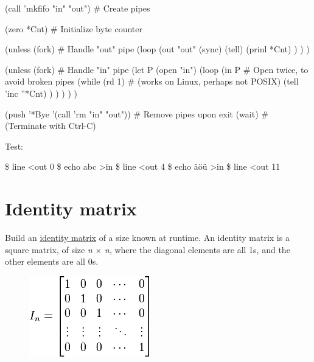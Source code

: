 \begin{wideverbatim}

(call 'mkfifo "in" "out")              # Create pipes

(zero *Cnt)                            # Initialize byte counter

(unless (fork)                         # Handle "out" pipe
   (loop
      (out "out"
         (sync)
         (tell)
         (prinl *Cnt) ) ) )

(unless (fork)                         # Handle "in" pipe
   (let P (open "in")
      (loop
         (in P                         # Open twice, to avoid broken pipes
            (while (rd 1)                 # (works on Linux, perhaps not POSIX)
               (tell 'inc ''*Cnt) ) ) ) ) )

(push '*Bye '(call 'rm "in" "out"))    # Remove pipes upon exit
(wait)                                 # (Terminate with Ctrl-C)

Test:

\$ line <out
0
\$ echo abc >in
\$ line <out
4
\$ echo äöü >in
\$ line <out
11

\end{wideverbatim}

\pagebreak{}
\section*{Identity matrix}

Build an \href{http://en.wikipedia.org/wiki/identity\_matrix}{identity
matrix} of a size known at runtime. An identity matrix is a square
matrix, of size \emph{n} × \emph{n}, where the diagonal elements are all
1s, and the other elements are all 0s.

\begin{figure}[H]
\centering
\includegraphics[scale=.6]{graphics/fe1a9857fd0a471baec6c538220e1bc9.png}
\end{figure}

